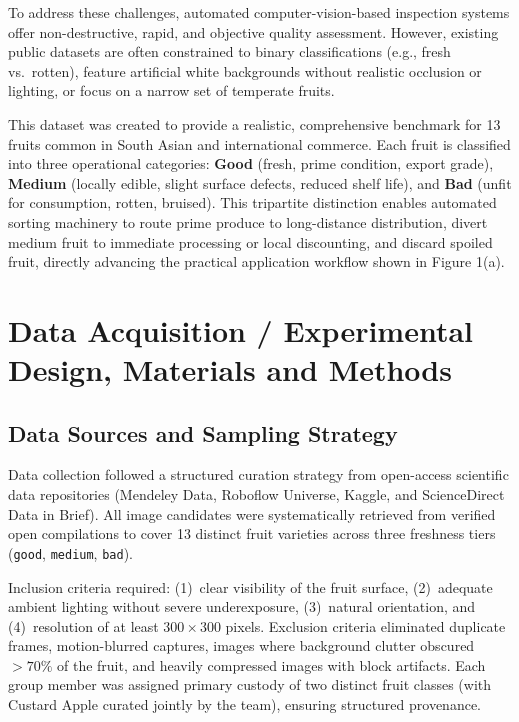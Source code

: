 \documentclass[11pt,a4paper]{article}
\begin{document}
To address these challenges, automated computer-vision-based inspection systems offer non-destructive, rapid, and objective quality assessment. However, existing public datasets are often constrained to binary classifications (e.g., fresh vs.\ rotten), feature artificial white backgrounds without realistic occlusion or lighting, or focus on a narrow set of temperate fruits. 

This dataset was created to provide a realistic, comprehensive benchmark for 13 fruits common in South Asian and international commerce. Each fruit is classified into three operational categories: \textbf{Good} (fresh, prime condition, export grade), \textbf{Medium} (locally edible, slight surface defects, reduced shelf life), and \textbf{Bad} (unfit for consumption, rotten, bruised). This tripartite distinction enables automated sorting machinery to route prime produce to long-distance distribution, divert medium fruit to immediate processing or local discounting, and discard spoiled fruit, directly advancing the practical application workflow shown in Figure 1(a).

\section{Data Acquisition / Experimental Design, Materials and Methods}

\subsection{Data Sources and Sampling Strategy}
Data collection followed a structured curation strategy from open-access scientific data repositories (Mendeley Data, Roboflow Universe, Kaggle, and ScienceDirect Data in Brief). All image candidates were systematically retrieved from verified open compilations to cover 13 distinct fruit varieties across three freshness tiers (\texttt{good}, \texttt{medium}, \texttt{bad}).

Inclusion criteria required: (1)~clear visibility of the fruit surface, (2)~adequate ambient lighting without severe underexposure, (3)~natural orientation, and (4)~resolution of at least $300 \times 300$ pixels. Exclusion criteria eliminated duplicate frames, motion-blurred captures, images where background clutter obscured $>70\%$ of the fruit, and heavily compressed images with block artifacts. Each group member was assigned primary custody of two distinct fruit classes (with Custard Apple curated jointly by the team), ensuring structured provenance.
\end{document}
